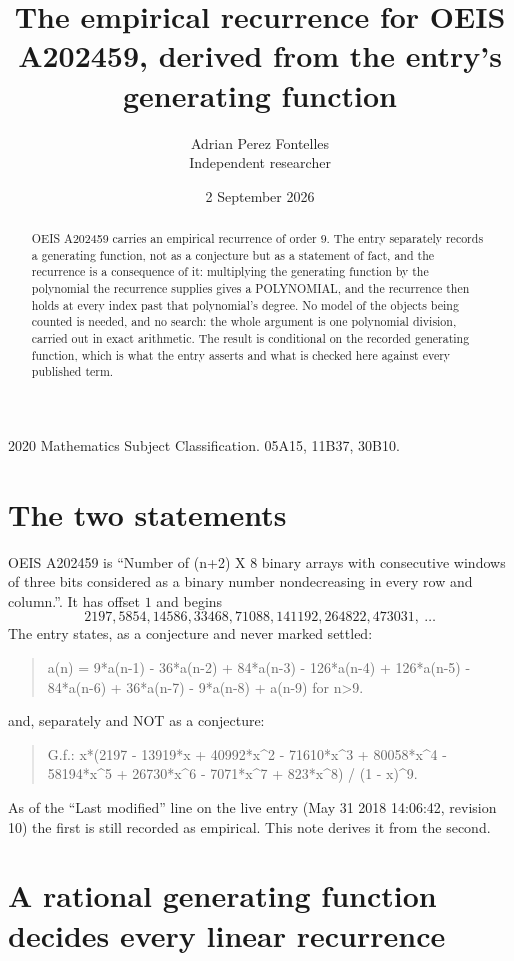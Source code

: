 \documentclass[11pt,a4paper]{article}
\title{The empirical recurrence for OEIS A202459, derived from the entry's generating function}
\author{Adrian Perez Fontelles\\ \small Independent researcher}
\date{2 September 2026}
\theoremstyle{plain}
\theoremstyle{definition}
\begin{document}
\maketitle

\begin{abstract}
OEIS A202459 carries an empirical recurrence of order $9$. The entry separately records a
generating function, not as a conjecture but as a statement of fact, and the recurrence is a
consequence of it: multiplying the generating function by the polynomial the recurrence
supplies gives a POLYNOMIAL, and the recurrence then holds at every index past that
polynomial's degree. No model of the objects being counted is needed, and no search: the
whole argument is one polynomial division, carried out in exact arithmetic. The result is
conditional on the recorded generating function, which is what the entry asserts and what is
checked here against every published term.
\end{abstract}

\noindent\small 2020 Mathematics Subject Classification. 05A15, 11B37, 30B10.\normalsize

\section{The two statements}

OEIS A202459 is ``Number of (n+2) X 8 binary arrays with consecutive windows of three bits considered as a binary number nondecreasing in every row and column.''. It has offset $1$ and begins
\[
2197, 5854, 14586, 33468, 71088, 141192, 264822, 473031,\ \dots
\]
The entry states, as a conjecture and never marked settled:
\begin{quote}
a(n) = 9*a(n-1) - 36*a(n-2) + 84*a(n-3) - 126*a(n-4) + 126*a(n-5) - 84*a(n-6) + 36*a(n-7) - 9*a(n-8) + a(n-9) for n>9.
\end{quote}
and, separately and NOT as a conjecture:
\begin{quote}
G.f.: x*(2197 - 13919*x + 40992*x\^{}2 - 71610*x\^{}3 + 80058*x\^{}4 - 58194*x\^{}5 + 26730*x\^{}6 - 7071*x\^{}7 + 823*x\^{}8) / (1 - x)\^{}9.
\end{quote}
As of the ``Last modified'' line on the live entry (May 31 2018 14:06:42, revision 10) the first is still
recorded as empirical. This note derives it from the second.

\section{A rational generating function decides every linear recurrence}
\end{document}
